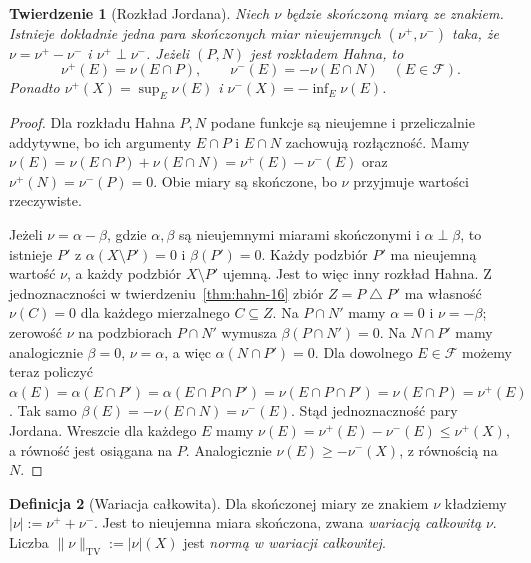 \documentclass[11pt,a4paper,oneside]{book}
\numberwithin{equation}{chapter}
\theoremstyle{plain}
\newtheorem{twierdzenie}{Twierdzenie}[chapter]
\theoremstyle{definition}
\newtheorem{definicja}[twierdzenie]{Definicja}
\theoremstyle{remark}
\begin{document}
\begin{twierdzenie}[Rozkład Jordana]
\label{thm:jordan-16}
Niech $\nu$ będzie skończoną miarą ze znakiem.
Istnieje dokładnie jedna para skończonych miar nieujemnych
$(\nu^+,\nu^-)$ taka, że
$\nu=\nu^+-\nu^-$ i $\nu^+\perp\nu^-$.
Jeżeli $(P,N)$ jest rozkładem Hahna, to
\[
\nu^+(E)=\nu(E\cap P),\qquad
\nu^-(E)=-\nu(E\cap N)\quad(E\in\mathcal F).
\]
Ponadto $\nu^+(X)=\sup_E\nu(E)$ i
$\nu^-(X)=-\inf_E\nu(E)$.
\end{twierdzenie}
\begin{proof}
Dla rozkładu Hahna $P,N$ podane funkcje
są nieujemne i przeliczalnie addytywne, bo ich
argumenty $E\cap P$ i $E\cap N$ zachowują rozłączność.
Mamy $\nu(E)=\nu(E\cap P)+\nu(E\cap N)
=\nu^+(E)-\nu^-(E)$ oraz
$\nu^+(N)=\nu^-(P)=0$. Obie miary są skończone,
bo $\nu$ przyjmuje wartości rzeczywiste.

Jeżeli $\nu=\alpha-\beta$, gdzie $\alpha,\beta$ są
nieujemnymi miarami skończonymi i $\alpha\perp\beta$,
to istnieje $P'$ z $\alpha(X\setminus P')=0$
i $\beta(P')=0$. Każdy podzbiór $P'$ ma nieujemną
wartość $\nu$, a każdy podzbiór $X\setminus P'$ ujemną.
Jest to więc inny rozkład Hahna. Z jednoznaczności
w twierdzeniu~\ref{thm:hahn-16} zbiór
$Z=P\mathbin\triangle P'$ ma własność $\nu(C)=0$
dla każdego mierzalnego $C\subseteq Z$.
Na $P\cap N'$ mamy $\alpha=0$ i $\nu=-\beta$;
zerowość $\nu$ na podzbiorach $P\cap N'$ wymusza
$\beta(P\cap N')=0$. Na $N\cap P'$ mamy analogicznie
$\beta=0$, $\nu=\alpha$, a więc
$\alpha(N\cap P')=0$. Dla dowolnego $E\in\mathcal F$
możemy teraz policzyć
$\alpha(E)=\alpha(E\cap P')=\alpha(E\cap P\cap P')
=\nu(E\cap P\cap P')=\nu(E\cap P)=\nu^+(E)$.
Tak samo $\beta(E)=-\nu(E\cap N)=\nu^-(E)$.
Stąd jednoznaczność pary Jordana.
Wreszcie dla każdego $E$ mamy
$\nu(E)=\nu^+(E)-\nu^-(E)\le\nu^+(X)$,
a równość jest osiągana na $P$. Analogicznie
$\nu(E)\ge-\nu^-(X)$, z równością na $N$.
\end{proof}

\begin{definicja}[Wariacja całkowita]
\label{def:variation-signed-16}
Dla skończonej miary ze znakiem $\nu$ kładziemy
$|\nu|:=\nu^++\nu^-$. Jest to nieujemna miara
skończona, zwana \emph{wariacją całkowitą} $\nu$.
Liczba $\|\nu\|_{\mathrm{TV}}:=|\nu|(X)$ jest
\emph{normą w wariacji całkowitej}.
\end{definicja}
\end{document}
